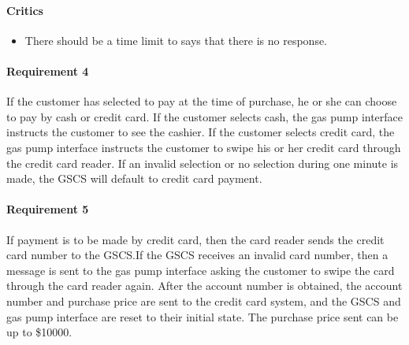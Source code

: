 \begin{framed}
    \paragraph{Critics} 
    \begin{itemize}
        \item There should be a time limit to says that there is no
            response.
    \end{itemize}

    \paragraph{Requirement 4} If the customer has selected to pay at the time of
    purchase, he or she can choose to pay by cash or credit card. If the
    customer selects cash, the gas pump interface instructs the customer to see
    the cashier. If the customer selects credit card, the gas pump interface
    instructs the customer to swipe his or her credit card through the credit
    card reader. If an invalid selection or no selection during one
    minute is made, the GSCS will default to credit card payment.
\end{framed}

\paragraph{Requirement 5} If payment is to be made by credit card, then the
card reader sends the credit card number to the GSCS.\@ If the GSCS receives
an invalid card number, then a message is sent to the gas pump interface
asking the customer to swipe the card through the card reader again. After
the account number is obtained, the account number and purchase price are
sent to the credit card system, and the GSCS and gas pump interface are
reset to their initial state. The purchase price sent can be up
to \${}10000.

